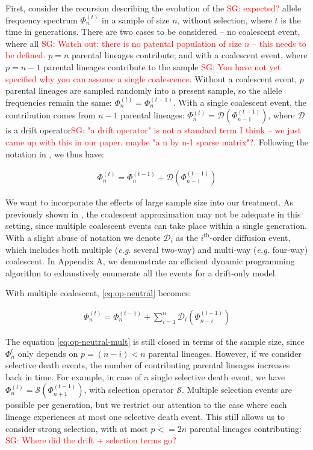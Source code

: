 \documentclass[review]{elsarticle}
\newcommand{\sgcomment}[1]{\textcolor{red}{SG: #1}}
\begin{document}
First, consider the recursion describing the evolution of the \sgcomment{expected?} allele frequency spectrum
$\Phi_{n}^{(t)}$ in a sample of size $n$, without selection, where $t$ is the time in generations. There are two cases to be considered --
no coalescent event, where all \sgcomment{Watch out: there is no patental population of size $n$ -- this needs to be defined.} $p=n$ parental lineages contribute; and with a coalescent event,
where $p=n-1$ parental lineages contribute to the sample \sgcomment{You have not yet specified why you can assume a single coalescence}. Without a coalescent event, $p$ parental
lineages are sampled randomly into a present sample, so the allele frequencies remain the same:
$\Phi_{n}^{(t)}=\Phi_{n}^{(t-1)}$. With a single coalescent event, the contribution comes from $n-1$
parental lineages: $\Phi_{n}^{(t)}=\mathcal{D}(\Phi_{n-1}^{(t-1)})$, where $\mathcal{D}$ is a drift
operator\sgcomment{"a drift operator" is not a standard term I think -- we just came up with this in our paper. maybe "a n by n-1 sparse matrix"?}. Following the notation in \cite{JouganousEtAl2017}, we thus have:

\begin{align}
  \label{eq:op-neutral}
  \Phi_{n}^{(t)}=\Phi_{n}^{(t-1)}+\mathcal{D}(\Phi_{n-1}^{(t-1)})
\end{align}

We want to incorporate the effects of large sample size into our treatment. As previously shown in
\cite{BhaskarEtAl2014,NelsonEtAl2019}, the coalescent approximation may not be adequate in this
setting, since multiple coalescent events can take place within a single generation. With a slight
abuse of notation we denote $\mathcal{D}_i$ as the $i^{\text{th}}$-order diffusion event, which includes both
multiple (\textit{e.g.} several two-way) and multi-way (\textit{e.g.} four-way) coalescent. In
Appendix A, we demonstrate an efficient dynamic programming algorithm to exhaustively enumerate all
the events for a drift-only model.

With multiple coalescent, \eqref{eq:op-neutral} becomes:

\begin{align}
  \label{eq:op-neutral-mult}
  \Phi_{n}^{(t)}=\Phi_{n}^{(t-1)}+\sum_{i=1}^{n}\mathcal{D}_i(\Phi_{n-i}^{(t-1)})
\end{align}

The equation \eqref{eq:op-neutral-mult} is still closed in terms of the sample size, since
$\Phi_{n}^{t}$ only depends on $p=(n-i)<n$ parental lineages. However, if we consider
selective death events, the number of contributing parental lineages increases back in time. For
example, in case of a single selective death event, we have
$\Phi_{n}^{(t)}=\mathcal{S}(\Phi_{n+1}^{(t-1)})$, with selection operator $\mathcal{S}$. Multiple
selection events are possible per generation, but we restrict our attention to the case where each
lineage experiences at most one selective death event. This still allows us to consider strong
selection, with at most $p<=2n$ parental lineages contributing: \sgcomment{Where did the drift + selection terms go?}
\end{document}
